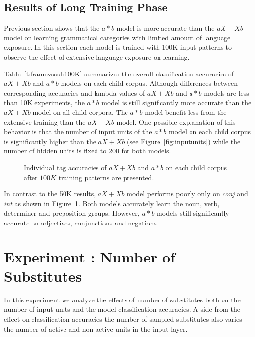 \subsection{Results of Long Training Phase} 

Previous section shows that the $a*b$ model is more accurate than the $aX+Xb$
model on learning grammatical categories with limited amount of language
exposure.  In this section each model is trained with 100K input patterns to
observe the effect of extensive language exposure on learning.


Table~\ref{t:framevssub100K} summarizes the overall classification accuracies
of $aX+Xb$ and $a*b$ models on each child corpus.  Although differences between
corresponding accuracies and lambda values of $aX+Xb$ and $a*b$ models are less
than 10K experiments, the $a*b$ model is still significantly more accurate than
the $aX+Xb$ model on all child corpora.  The $a*b$ model benefit less from the
extensive training than the $aX+Xb$ model. One possible explanation of this
behavior is that the number of input units of the $a*b$ model on each child
corpus is significantly higher than the $aX+Xb$ (see
Figure~\ref{fig:inputunits}) while the number of hidden units is fixed to 200
for both models. 

\begin{figure}[h]
  \caption{Individual tag accuracies of $aX+Xb$ and $a*b$ on each child corpus
  after $100K$ training patterns are presented.}  
  \label{fig:category100K}
\end{figure}

In contrast to the 50K results, $aX+Xb$ model performs poorly only on {\it
conj} and {\it int} as shown in Figure~\ref{fig:category100K}.  Both models
accurately learn the noun, verb, determiner and preposition groups.  However,
$a*b$ models still significantly accurate on adjectives, conjunctions and
negations.

\section{Experiment : Number of Substitutes}
\label{s:exp_substitutes}
In this experiment we analyze the effects of number of substitutes both on the
number of input units and the model classification accuracies.  A side from the
effect on classification accuracies the number of sampled substitutes also
varies the number of active and non-active units in the input layer.  

